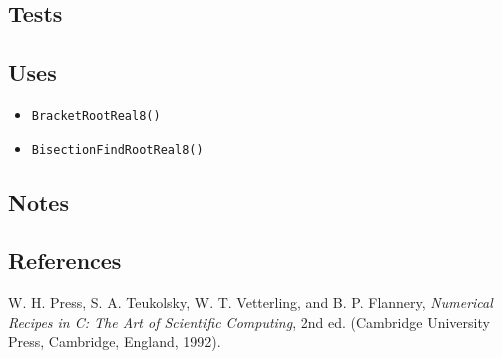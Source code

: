 \documentclass{article}
\begin{document}


\subsection{Tests}


\subsection{Uses}


\begin{itemize}
\item\texttt{BracketRootReal8()}
\item\texttt{BisectionFindRootReal8()}
\end{itemize}

\subsection{Notes}

\subsection{References}

\begin{thebibliography}{0}

  W. H. Press, S. A. Teukolsky, W. T. Vetterling, and B. P. Flannery,
  \textit{Numerical Recipes in C: The Art of Scientific Computing}, 2nd ed.
  (Cambridge University Press, Cambridge, England, 1992).
\end{thebibliography}
\end{document}
